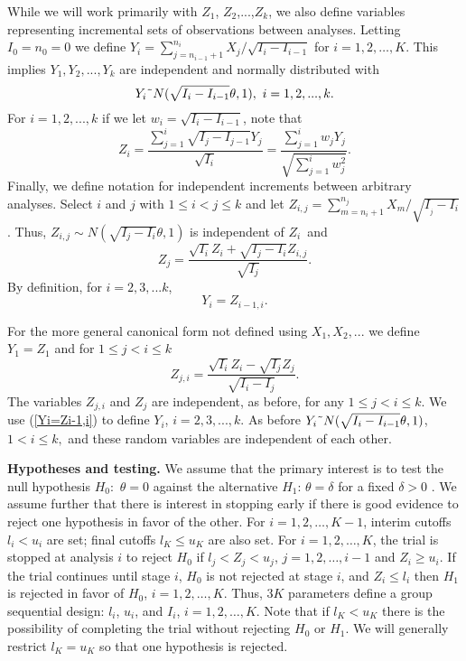 While we will work primarily with $Z_{1}$, $Z_{2}$,...,$Z_{k}$, we also define
variables representing incremental sets of observations between analyses.
Letting $I_{0}=n_{0}=0$ we define $Y_{i}=\sum_{j=n_{i-1}+1}^{n_{i}}X_{j}%
/\sqrt{I_{i}-I_{i-1}}$ for $i=1,2,\ldots,K$. This implies $Y_{1}%
,Y_{2},...,Y_{k}$ are independent and normally distributed with
\begin{equation}
Y_{i}\symbol{126}N(\sqrt{I_{i}-I_{i-1}}\theta,1),\text{ }%
i=1,2,...,k.\label{Yi joint dist}%
\end{equation}
For $i=1,2,...,k$ if we let $w_{i}=\sqrt{I_{i}-I_{i-1}}$, note that
\begin{equation}
Z_{i}=\frac{\sum_{j=1}^{i}\sqrt{I_{j}-I_{j-1}}Y_{j}}{\sqrt{I_{i}}}=\frac
{\sum_{j=1}^{i}w_{j}Y_{j}}{\sqrt{\sum_{j=1}^{i}w_{j}^{2}}}%
.\label{Z sum of ind Y}%
\end{equation}
Finally, we define notation for independent increments between arbitrary
analyses. Select $i$ and $j$ with $1\leq i<j\leq k$ and let $Z_{i,j}%
=\sum_{m=n_{i}+1}^{n_{j}}X_{m}/\sqrt{I_{_{j}}-I_{i}}$. Thus, $Z_{i,j}\sim
N(\sqrt{I_{j}-I_{i}}\theta,1)$ is independent of $Z_{i}$\ and
\begin{equation}
Z_{j}=\frac{\sqrt{I_{i}}Z_{i}+\sqrt{I_{j}-I_{i}}Z_{i,j}}{\sqrt{I_{j}}%
}.\label{Zj as ind inc}%
\end{equation}
By definition, for $i=2,3,...k$,
\begin{equation}
Y_{i}=Z_{i-1,i}.\label{Yi=Zi-1,i}%
\end{equation}
\bigskip

For the more general canonical form not defined using $X_{1},X_{2},...$ we
define $Y_{1}=Z_{1}$ and for $1\leq j<i\leq k$
\begin{equation}
Z_{j,i}=\frac{\sqrt{I_{i}}Z_{i}-\sqrt{I_{j}}Z_{j}}{\sqrt{I_{i}-I_{j}}%
}.\label{Zij implicit}%
\end{equation}
\bigskip The variables $Z_{j,i}$ and $Z_{j}$ are independent, as before, for
any $1\leq j<i\leq k$. We use (\ref{Yi=Zi-1,i}) to define $Y_{i}$,
$i=2,3,...,k.$ As before $Y_{i}\symbol{126}N(\sqrt{I_{i}-I_{i-1}}\theta,1)$,
$1<i\leq k,$ and these random variables are independent of each other.

\textbf{Hypotheses and testing.} We assume that the primary interest is to
test the null hypothesis $H_{0}$:~$\theta=0$ against the alternative $H_{1}$:
$\theta=\delta$ for a fixed $\delta>0$ . We assume further that there is
interest in stopping early if there is good evidence to reject one hypothesis
in favor of the other. For $i=1,2,\ldots,K-1$, interim cutoffs $l_{i}<u_{i}$
are set; final cutoffs $l_{K}\leq u_{K}$ are also set. For $i=1,2,\ldots,K$,
the trial is stopped at analysis $i$ to reject $H_{0}$ if $l_{j}<Z_{j}<u_{j}$,
$j=1,2,\dots,i-1$ and $Z_{i}\geq u_{i}$. If the trial continues until stage
$i$, $H_{0}$ is not rejected at stage $i$, and $Z_{i}\leq l_{i}$ then $H_{1}$
is rejected in favor of $H_{0}$, $i=1,2,\ldots,K$. Thus, $3K$ parameters
define a group sequential design: $l_{i}$, $u_{i}$, and $I_{i}$,
$i=1,2,\ldots,K$. Note that if $l_{K}<u_{K}$ there is the possibility of
completing the trial without rejecting $H_{0}$ or $H_{1}$. We will generally
restrict $l_{K}=u_{K}$ so that one hypothesis is rejected.

